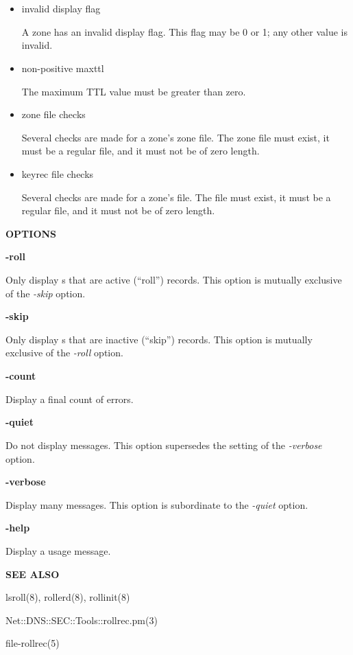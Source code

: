 \begin{itemize}
\item invalid display flag\verb" "

A zone has an invalid display flag.  This flag may be 0 or 1;
any other value is invalid.

\item non-positive maxttl\verb" "

The maximum TTL value must be greater than zero.

\item zone file checks\verb" "

Several checks are made for a zone's zone file.  The zone file must exist, it
must be a regular file, and it must not be of zero length.

\item keyrec file checks\verb" "

Several checks are made for a zone's  file.  The
 file must exist, it must be a regular file, and
it must not be of zero length.

\end{itemize}

{\bf OPTIONS}

\begin{description}

\item {\bf -roll}\verb" "

Only display s that are active (``roll'') records.
This option is mutually exclusive of the {\it -skip} option.

\item {\bf -skip}\verb" "

Only display s that are inactive (``skip'') records.
This option is mutually exclusive of the {\it -roll} option.

\item {\bf -count}\verb" "

Display a final count of errors.

\item {\bf -quiet}\verb" "

Do not display messages.  This option supersedes the setting of the
{\it -verbose} option.

\item {\bf -verbose}\verb" "

Display many messages.  This option is subordinate to the {\it -quiet} option.

\item {\bf -help}\verb" "

Display a usage message.

\end{description}

{\bf SEE ALSO}

lsroll(8),
rollerd(8),
rollinit(8)

Net::DNS::SEC::Tools::rollrec.pm(3)

file-rollrec(5)


